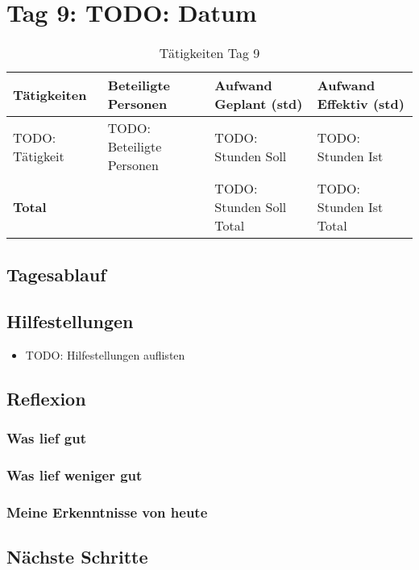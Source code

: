 \section{Tag 9: TODO: Datum}
\begin{table}[H]
    \begin{tabular}{|L{0.4\textwidth}|C{60pt}|C{60pt}|C{60pt}|}
        \hline
        \color{white}Tätigkeiten & \color{white}Beteiligte \color{white}Personen & \color{white}Aufwand Geplant (std) & \color{white}Aufwand Effektiv (std) \\
        \hline
        TODO: Tätigkeit & TODO: Beteiligte Personen & TODO: Stunden Soll & TODO: Stunden Ist \\
        \hline
        \textbf{Total} & & TODO: Stunden Soll Total & TODO: Stunden Ist Total \\
        \hline
    \end{tabular}
    \caption{Tätigkeiten Tag 9}
\end{table}

\subsection*{Tagesablauf}


\subsection*{Hilfestellungen}
\begin{itemize}
    \item TODO: Hilfestellungen auflisten
\end{itemize}

\subsection*{Reflexion}
\subsubsection*{Was lief gut}

\subsubsection*{Was lief weniger gut}

\subsubsection*{Meine Erkenntnisse von heute}

\subsection*{Nächste Schritte}

\pagebreak
